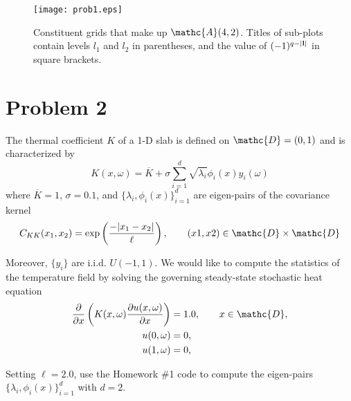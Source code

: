\documentclass[11pt]{article}
\begin{document}
\begin{figure}[h]
\centering
\texttt{[image: prob1.eps]}
\caption{Constituent grids that make up $\mathc{A}(4,2)$. Titles of sub-plots contain levels $l_1$ and $l_2$ in parentheses, and the value of $(-1)^{q-|\mb{l}|}$ in square brackets.}
\label{fig:prob1}
\end{figure}



\section*{Problem 2} %

The thermal coefficient $K$ of a 1-D slab is defined on $\mathc{D} = (0,1)$ and is characterized by
\begin{equation}
K(x,\omega) = \overline{K} + \sigma \sum_{i=1}^d \sqrt{\lambda_i} \phi_i(x) y_i(\omega)
\end{equation}
where $\overline{K}=1$, $\sigma=0.1$, and $\{ \lambda_i, \phi_i(x) \}_{i=1}^d$ are eigen-pairs of the covariance kernel
\begin{equation}
C_{KK}(x_1,x_2) = \exp \left( \frac{- | x_1-x_2 | }{\ell} \right), \qquad (x1,x2) \in \mathc{D} \times \mathc{D}
\end{equation}

Moreover, $\{y_i\}$ are i.i.d. $U(-1,1)$. We would like to compute the statistics of the temperature field by solving the governing steady-state stochastic heat equation
\begin{equation}
\begin{aligned}
\pp{}{x} \left( K(x,\omega) \pp{u(x,\omega)}{x} \right) &= 1.0, \qquad x \in \mathc{D}, \\
u(0,\omega) &= 0, \\
u(1,\omega) &= 0,
\end{aligned}
\label{eq:pde}
\end{equation}

Setting $\ell = 2.0$, use the Homework \#1 code to compute the eigen-pairs $\{ \lambda_i, \phi_i(x) \}_{i=1}^d$ with $d=2$.
\end{document}

